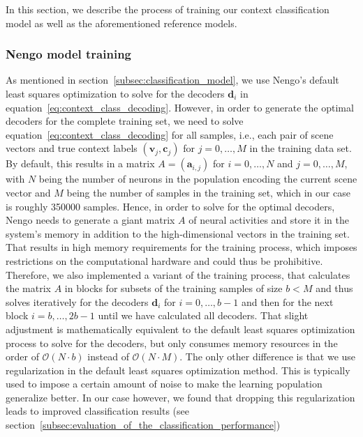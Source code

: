 In this section, we describe the process of training our context classification model as well as the aforementioned reference models.

\subsubsection{Nengo model training}%
\label{ssubsec:nengo_model_training}

As mentioned in section~\ref{subsec:classification_model}, we use \ac{Nengo}'s default least squares optimization to solve for the decoders $ \mathbf{d}_{i}$ in equation~\eqref{eq:context_class_decoding}.
However, in order to generate the optimal decoders for the complete training set, we need to solve equation~\eqref{eq:context_class_decoding} for all samples, i.e., each pair of scene vectors and true context labels  $ \left( \mathbf{v}_{j}, \mathbf{c}_j\right)$ for $j=0, \ldots, M$ in the training data set.
By default, this results in a matrix $A = \left( \mathbf{a}_{i,j}\right)$ for $i=0, \ldots, N$ and $j=0, \ldots, M$, with $N$ being the number of neurons in the population encoding the current scene vector and $M$ being the number of samples in the training set, which in our case is roughly \num{350000} samples.
Hence, in order to solve for the optimal decoders, \ac{Nengo} needs to generate a giant matrix $A$ of neural activities and store it in the system's memory in addition to the high-dimensional vectors in the training set.
That results in high memory requirements for the training process, which imposes restrictions on the computational hardware and could thus be prohibitive.
Therefore, we also implemented a variant of the training process, that calculates the matrix $A$ in blocks for subsets of the training samples of size $b < M$ and thus solves iteratively for the decoders $ \mathbf{d}_{i}$ for $i=0, \ldots, b-1$ and then for the next block $i=b, \ldots, 2b-1$ until we have calculated all decoders.
That slight adjustment is mathematically equivalent to the default least squares optimization process to solve for the decoders, but only consumes memory resources in the order of $ \mathcal{O}\left(N\cdot b\right)$ instead of $ \mathcal{O}\left(N \cdot M\right)$.
The only other difference is that we use regularization in the default least squares optimization method.
This is typically used to impose a certain amount of noise to make the learning population generalize better.
In our case however, we found that dropping this regularization leads to improved classification results (see section~\ref{subsec:evaluation_of_the_classification_performance})

